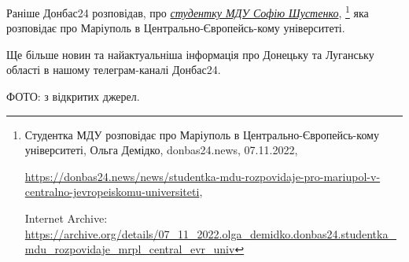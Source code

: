 Раніше Донбас24 розповідав, про \href{https://archive.org/details/07_11_2022.olga_demidko.donbas24.studentka_mdu_rozpovidaje_mrpl_central_evr_univ}{\emph{студентку МДУ Софію Шустенко}},%
\footnote{Студентка МДУ розповідає про Маріуполь в Центрально-Європейсь\hyp{}кому університеті, Ольга Демідко, donbas24.news, 07.11.2022, \par%
\url{https://donbas24.news/news/studentka-mdu-rozpovidaje-pro-mariupol-v-centralno-jevropeiskomu-universiteti}, \par%
Internet Archive: \url{https://archive.org/details/07_11_2022.olga_demidko.donbas24.studentka_mdu_rozpovidaje_mrpl_central_evr_univ}%
} яка розповідає про Маріуполь в Центрально-Європейсь\hyp{}кому університеті.

Ще більше новин та найактуальніша інформація про Донецьку та Луганську області
в нашому телеграм-каналі Донбас24.

ФОТО: з відкритих джерел.

